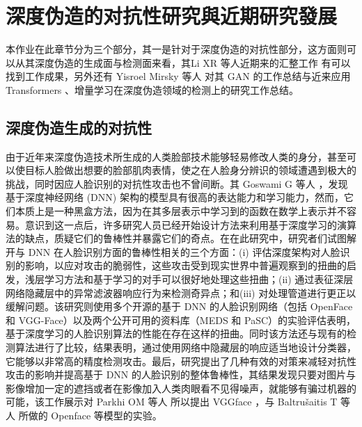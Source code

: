 \chapter{深度伪造的对抗性研究與近期研究發展}
\label{chap:4}

本作业在此章节分为三个部分，其一是针对于深度伪造的对抗性部分，这方面则可以从其深度伪造的生成面与检测面来看，其Li XR 等人近期来的汇整工作\cite{2021496} 有可以找到工作成果，另外还有 Yisroel Mirsky 等人 \cite{DBLP:journals/corr/abs-2004-11138} 对其 GAN 的工作总结与近来应用 Transformers 、增量学习在深度伪造领域的检测上的研究工作总结。


\section{深度伪造生成的对抗性}

由于近年来深度伪造技术所生成的人类脸部技术能够轻易修改人类的身分，甚至可以使目标人脸做出想要的脸部肌肉表情，使之在人脸身分辨识的领域遭遇到极大的挑战，同时因应人脸识别的对抗性攻击也不曾间断。其 Goswami G 等人 \cite{goswami2018unravelling}，发现基于深度神经网络 (DNN) 架构的模型具有很高的表达能力和学习能力，然而，它们本质上是一种黑盒方法，因为在其多层表示中学习到的函数在数学上表示并不容易。意识到这一点后，许多研究人员已经开始设计方法来利用基于深度学习的演算法的缺点，质疑它们的鲁棒性并暴露它们的奇点。在在此研究中，研究者们试图解开与 DNN 在人脸识别方面的鲁棒性相关的三个方面：(i) 评估深度架构对人脸识别的影响，以应对攻击的脆弱性，这些攻击受到现实世界中普遍观察到的扭曲的启发，浅层学习方法和基于学习的对手可以很好地处理这些扭曲；(ii) 通过表征深层网络隐藏层中的异常滤波器响应行为来检测奇异点；和(iii) 对处理管道进行更正以缓解问题。该研究则使用多个开源的基于 DNN 的人脸识别网络（包括 OpenFace 和 VGG-Face）以及两个公开可用的资料库（MEDS 和 PaSC）的实验评估表明，基于深度学习的人脸识别算法的性能在存在这样的扭曲。同时该方法还与现有的检测算法进行了比较，结果表明，通过使用网络中隐藏层的响应适当地设计分类器，它能够以非常高的精度检测攻击。最后，研究提出了几种有效的对策来减轻对抗性攻击的影响并提高基于 DNN 的人脸识别的整体鲁棒性，其结果发现只要对图片与影像增加一定的遮挡或者在影像加入人类肉眼看不见得噪声，就能够有骗过机器的可能，该工作展示对 Parkhi OM 等人 \cite{parkhi2015deep} 所以提出 VGGface ，与 Baltrušaitis T 等人 \cite{baltruvsaitis2016openface} 所做的 Openface 等模型的实验。

